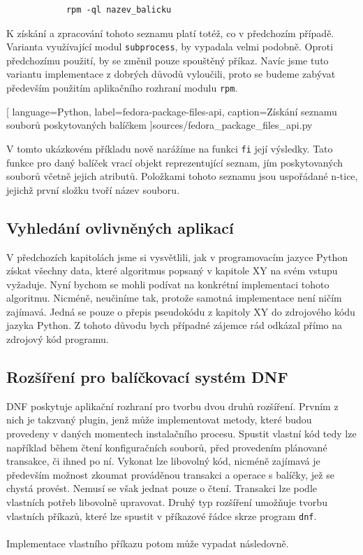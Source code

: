 \documentclass[
  field=inf,
  biblatex,
  glossaries,
  index
]{kidiplom}
\begin{document}
		\begin{lstlisting}
			rpm -ql nazev_balicku
		\end{lstlisting}

		K získání a zpracování tohoto seznamu platí totéž, co v předchozím případě. Varianta využívající modul \texttt{subprocess}, by vypadala velmi podobně. Oproti předchozímu použití, by se změnil pouze spouštěný příkaz. Navíc jsme tuto variantu implementace z dobrých důvodů vyloučili, proto se budeme zabývat především použitím aplikačního rozhraní modulu \texttt{rpm}.

		
		[
			language=Python,
			label=fedora-package-files-api,
			caption={Získání seznamu souborů poskytovaných balíčkem}
		]{sources/fedora_package_files_api.py}

		V tomto ukázkovém příkladu nově narážíme na funkci \texttt{fi} její výsledky. Tato funkce pro daný balíček vrací objekt reprezentující seznam, jím poskytovaných souborů včetně jejich atributů. Položkami tohoto seznamu jsou uspořádané n-tice, jejichž první složku tvoří název souboru.

	\subsection{Vyhledání ovlivněných aplikací}
		V předchozích kapitolách jsme si vysvětlili, jak v programovacím jazyce Python získat všechny data, které algoritmus popsaný v kapitole XY na svém vstupu vyžaduje. Nyní bychom se mohli podívat na konkrétní implementaci tohoto algoritmu. Nicméně, neučiníme tak, protože samotná implementace není ničím zajímavá. Jedná se pouze o přepis pseudokódu z kapitoly XY do zdrojového kódu jazyka Python. Z tohoto důvodu bych případné zájemce rád odkázal přímo na zdrojový kód programu.

	\newpage
	\subsection{Rozšíření pro balíčkovací systém DNF}
	DNF poskytuje aplikační rozhraní pro tvorbu dvou druhů rozšíření. Prvním z nich je takzvaný plugin, jenž může implementovat metody, které budou provedeny v daných momentech instalačního procesu. Spustit vlastní kód tedy lze například během čtení konfiguračních souborů, před provedením plánované transakce, či ihned po ní. Vykonat lze libovolný kód, nicméně zajímavá je především možnost zkoumat prováděnou transakci a operace s balíčky, jež se chystá provést. Nemusí se však jednat pouze o čtení. Transakci lze podle vlastních potřeb libovolně upravovat. Druhý typ rozšíření umožňuje tvorbu vlastních příkazů, které lze spustit v příkazové řádce skrze program \texttt{dnf}.
	\\
	\\
	Implementace vlastního příkazu potom může vypadat následovně.
\end{document}
